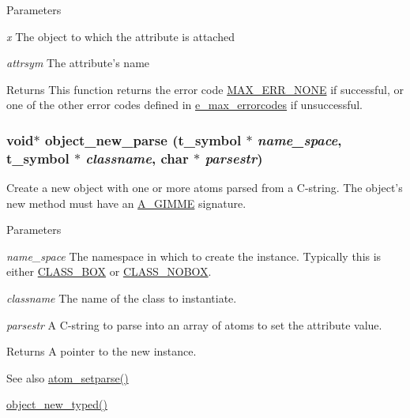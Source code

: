 \begin{DoxyParams}{Parameters}
\item[{\em x}]The object to which the attribute is attached \item[{\em attrsym}]The attribute's name\end{DoxyParams}
\begin{DoxyReturn}{Returns}
This function returns the error code \hyperlink{group__misc_gga0764dd6c02b76cca7d053ae50555d69da6d22f77fef8b1e1b074cef5d29d935fd}{MAX\_\-ERR\_\-NONE} if successful, or one of the other error codes defined in \hyperlink{group__misc_ga0764dd6c02b76cca7d053ae50555d69d}{e\_\-max\_\-errorcodes} if unsuccessful. 
\end{DoxyReturn}
\hypertarget{group__attr_ga530d393de8adb8e42221d53458cfdc76}{
\subsubsection[{object\_\-new\_\-parse}]{\setlength{\rightskip}{0pt plus 5cm}void$\ast$ object\_\-new\_\-parse ({\bf t\_\-symbol} $\ast$ {\em name\_\-space}, \/  {\bf t\_\-symbol} $\ast$ {\em classname}, \/  char $\ast$ {\em parsestr})}}
\label{group__attr_ga530d393de8adb8e42221d53458cfdc76}


Create a new object with one or more atoms parsed from a C-\/string. The object's new method must have an \hyperlink{group__atom_gga8aa6700e9f00b132eb376db6e39ade47a81c1a8550f038db16a619167a70a79b6}{A\_\-GIMME} signature.


\begin{DoxyParams}{Parameters}
\item[{\em name\_\-space}]The namespace in which to create the instance. Typically this is either \hyperlink{group__class_gaf640c99a1fceb8158c2d1e77381b0320}{CLASS\_\-BOX} or \hyperlink{group__class_ga090d3cbc4f137661806fc1b72249a791}{CLASS\_\-NOBOX}. \item[{\em classname}]The name of the class to instantiate. \item[{\em parsestr}]A C-\/string to parse into an array of atoms to set the attribute value.\end{DoxyParams}
\begin{DoxyReturn}{Returns}
A pointer to the new instance. 
\end{DoxyReturn}
\begin{DoxySeeAlso}{See also}
\hyperlink{group__atom_ga55938aedb41a8f3565680cf29169dc70}{atom\_\-setparse()} 

\hyperlink{group__obj_ga459c71aca6316e345379eeb424ad56ff}{object\_\-new\_\-typed()} 
\end{DoxySeeAlso}
